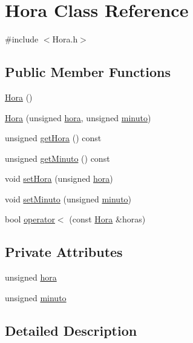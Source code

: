 \hypertarget{class_hora}{\section{Hora Class Reference}
\label{class_hora}
}


{\ttfamily \#include $<$Hora.\+h$>$}

\subsection*{Public Member Functions}
\begin{DoxyCompactItemize}
\item 
\hyperlink{class_hora_a90c18369977bbf1bf3a7370d8ea9e9ae}{Hora} ()
\item 
\hyperlink{class_hora_ac2b1f6c87010f4c8af8c3f1986c02b23}{Hora} (unsigned \hyperlink{class_hora_ab901e62ae1158965687dc736a45ee8fe}{hora}, unsigned \hyperlink{class_hora_a9d33ce2d8a3f4b3d05b2a3c6df782fa4}{minuto})
\item 
unsigned \hyperlink{class_hora_ae55080cc8706bcbf135036edcc4112a5}{get\+Hora} () const 
\item 
unsigned \hyperlink{class_hora_adccaf5d0c9e674462f77b31ae05bdb86}{get\+Minuto} () const 
\item 
void \hyperlink{class_hora_afc47b74f8d5673565ebe3de1bbfb92a6}{set\+Hora} (unsigned \hyperlink{class_hora_ab901e62ae1158965687dc736a45ee8fe}{hora})
\item 
void \hyperlink{class_hora_abca266485eb34d8feaf1f9e84854a7f3}{set\+Minuto} (unsigned \hyperlink{class_hora_a9d33ce2d8a3f4b3d05b2a3c6df782fa4}{minuto})
\item 
bool \hyperlink{class_hora_a24d925d0c6d35e813542346e5d63eef9}{operator$<$} (const \hyperlink{class_hora}{Hora} \&horas)
\end{DoxyCompactItemize}
\subsection*{Private Attributes}
\begin{DoxyCompactItemize}
\item 
unsigned \hyperlink{class_hora_ab901e62ae1158965687dc736a45ee8fe}{hora}
\item 
unsigned \hyperlink{class_hora_a9d33ce2d8a3f4b3d05b2a3c6df782fa4}{minuto}
\end{DoxyCompactItemize}


\subsection{Detailed Description}


